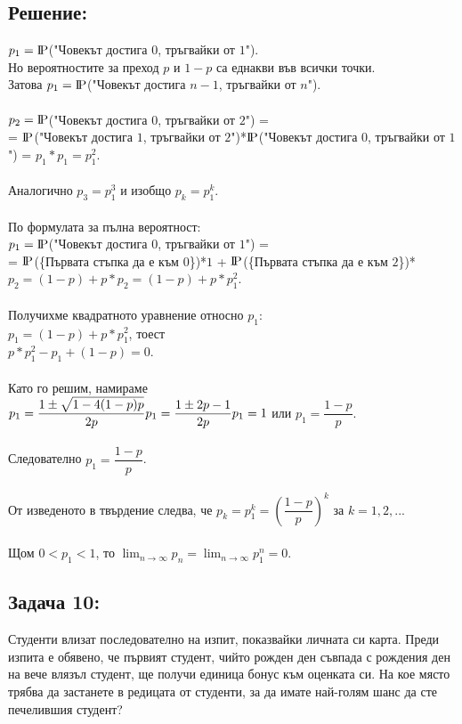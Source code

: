 \documentclass[french]{article}
\newcommand{\probP}{\text{I\kern-0.15em P}}
\begin{document}
	\subsection*{Решение:}
	$p_1 = \probP$("Човекът достига $0$, тръгвайки от $1$"). \\
	Но вероятностите за преход $p$ и $1 - p$ са еднакви във всички точки. \\
	Затова $p_1 = \probP$("Човекът достига $n-1$, тръгвайки от $n$"). \\
	\\
	$p_2 = \probP$("Човекът достига $0$, тръгвайки от $2$") = \\
	= $\probP$("Човекът достига $1$, тръгвайки от $2$")*$\probP$("Човекът достига $0$, тръгвайки от $1$") = $p_1*p_1 = p_1^2$. \\
	\\
	Аналогично $p_3 = p_1^3$ и изобщо $p_k = p_1^k$. \\
	\\
	По формулата за пълна вероятност: \\
	$p_1 = \probP$("Човекът достига $0$, тръгвайки от $1$") = \\ = $\probP$(\{Първата стъпка да е към $0$\})*$1$ + $\probP$(\{Първата стъпка да е към $2$\})*$p_2 = (1-p) + p*p_2 = (1-p) + p*p_1^2$. \\
	\\
	Получихме квадратното уравнение относно $p_1$: \\
	$p_1 = (1 - p) + p * p_1^2$, тоест \\
	$p * p_1^2 - p_1 + (1 - p) = 0$. \\ \\
	Като го решим, намираме \\
	$p_1 = \dfrac{1 \pm \sqrt{1 - 4(1 - p)p}}{2p} \\
	p_1 = \dfrac{1 \pm 2p - 1}{2p} \\
	p_1 = 1$ или $p_1 = \dfrac{1 - p}{p}$. \\
	\\
	Следователно $p_1 = \dfrac{1 - p}{p}$. \\
	\\
	От изведеното в твърдение следва, че $p_k = p_1^k = \left(\dfrac{1 - p}{p}\right)^k$ за $k = 1,2,...$ \\
	\\
	Щом $0 < p_1 < 1$, то $\lim_{n\to\infty}p_n = \lim_{n\to\infty}p_1^n = 0$.
	
	
	\subsection*{Задача 10:}
	Студенти влизат последователно на изпит, показвайки личната си карта. Преди изпита е обявено, че първият студент, чийто рожден ден съвпада с рождения ден на вече влязъл студент, ще получи единица бонус към оценката си. На кое място трябва да застанете в редицата от студенти, за да имате най-голям шанс да сте печелившия студент?
	
\end{document}
